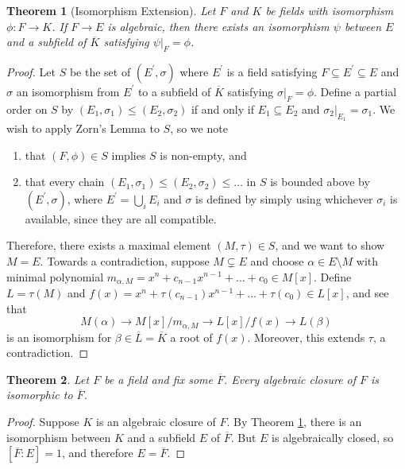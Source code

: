 \documentclass[
    parskip=half,
    toc=flat,
    toc=sectionentrydotfill,
]{scrartcl}  %
\theoremstyle{definition}
\theoremstyle{plain}
\newtheorem{theorem}{Theorem}[section]
\theoremstyle{remark}
\begin{document}
\begin{theorem}[Isomorphism Extension]
    \label{thm:Isomorphism Extension}
    Let $F$ and $K$ be fields with isomorphism $\phi:F\to K$.
    If $F\to E$ is algebraic, then there exists an isomorphism $\psi$ between $E$ and a subfield of $\overline{K}$
    satisfying $\psi\vert_F=\phi$.
\end{theorem}

\begin{proof}
    Let $S$ be the set of $(E^\prime,\sigma)$ where $E^\prime$ is a field satisfying $F\subseteq E^\prime\subseteq E$
    and $\sigma$ an isomorphism from $E^\prime$ to a subfield of $\overline{K}$ satisfying $\sigma\vert_F=\phi$.
    Define a partial order on $S$ by $(E_1,\sigma_1)\leq (E_2,\sigma_2)$ if and only if $E_1\subseteq E_2$ and
    $\sigma_2\vert_{E_1}=\sigma_1$.
    We wish to apply Zorn's Lemma to $S$, so we note
    \begin{enumerate}
        \item that $(F,\phi)\in S$ implies $S$ is non-empty, and

        \item
            that every chain $(E_1,\sigma_1)\leq(E_2,\sigma_2)\leq\dots$ in $S$ is bounded above by
            $(E^\prime,\sigma)$, where $E^\prime=\bigcup_iE_i$ and $\sigma$ is defined by simply using whichever
            $\sigma_i$ is available, since they are all compatible.
    \end{enumerate}
    Therefore, there exists a maximal element $(M,\tau)\in S$, and we want to show $M=E$.
    Towards a contradiction, suppose $M\subsetneq E$ and choose $\alpha\in E\setminus M$ with minimal polynomial
    $m_{\alpha,M}=x^n+c_{n-1}x^{n-1}+\dots+c_0\in M[x]$.
    Define $L=\tau(M)$ and $f(x)=x^n+\tau(c_{n-1})x^{n-1}+\dots+\tau(c_0)\in L[x]$, and see that
    \[M(\alpha)\to M[x]/m_{\alpha,M}\to L[x]/f(x)\to L(\beta)\]
    is an isomorphism for $\beta\in\overline{L}=\overline{K}$ a root of $f(x)$.
    Moreover, this extends $\tau$, a contradiction.
\end{proof}

\begin{theorem}
    Let $F$ be a field and fix some $\overline{F}$.
    Every algebraic closure of $F$ is isomorphic to $\overline{F}$.
\end{theorem}

\begin{proof}
    Suppose $K$ is an algebraic closure of $F$.
    By Theorem \ref{thm:Isomorphism Extension}, there is an isomorphism between $K$ and a subfield $E$ of $\overline{F}$.
    But $E$ is algebraically closed, so $[\overline{F}:E]=1$, and therefore $E=\overline{F}$.
\end{proof}
\end{document}
